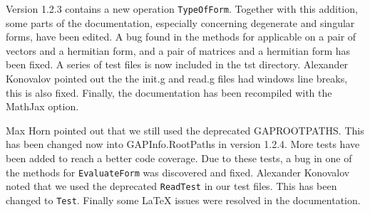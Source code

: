 \documentclass[a4paper,11pt]{report}
\begin{document}
{{Version 1.2.3 contains a new operation \texttt{TypeOfForm}. Together with this addition, some parts of the documentation, especially
concerning degenerate and singular forms, have been edited. A bug found in the
methods for \texttt{\texttt{}\texttt{}} applicable on a pair of vectors and a hermitian form, and a pair of matrices
and a hermitian form has been fixed. A series of test files is now included in
the tst directory. Alexander Konovalov pointed out the the init.g and read.g
files had windows line breaks, this is also fixed. Finally, the documentation
has been recompiled with the MathJax option. 

Max Horn pointed out that we still used the deprecated
GAP{\textunderscore}ROOT{\textunderscore}PATHS. This has been changed now into
GAPInfo.RootPaths in version 1.2.4. More tests have been added to reach a
better code coverage. Due to these tests, a bug in one of the methods for \texttt{EvaluateForm} was discovered and fixed. Alexander Konovalov noted that we used the
deprecated \texttt{ReadTest} in our test files. This has been changed to \texttt{Test}. Finally some LaTeX issues were resolved in the documentation. }

  }

  
\end{document}
